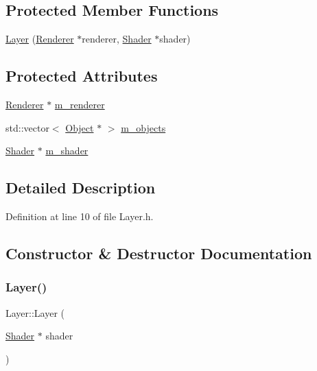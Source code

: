\subsection*{Protected Member Functions}
\begin{DoxyCompactItemize}
\item 
\hyperlink{class_layer_a4fe3c6314cb78fef7ffef3f6439fc195}{Layer} (\hyperlink{class_renderer}{Renderer} $\ast$renderer, \hyperlink{class_shader}{Shader} $\ast$shader)
\end{DoxyCompactItemize}
\subsection*{Protected Attributes}
\begin{DoxyCompactItemize}
\item 
\hyperlink{class_renderer}{Renderer} $\ast$ \hyperlink{class_layer_a37e53fc9b8764c7fa4b69de8f037a76f}{m\+\_\+renderer}
\item 
std\+::vector$<$ \hyperlink{class_object}{Object} $\ast$ $>$ \hyperlink{class_layer_a5dd19348285314342a7721c000c97179}{m\+\_\+objects}
\item 
\hyperlink{class_shader}{Shader} $\ast$ \hyperlink{class_layer_aa7cd5a12a7862c9127316d065278f5cc}{m\+\_\+shader}
\end{DoxyCompactItemize}


\subsection{Detailed Description}


Definition at line 10 of file Layer.\+h.



\subsection{Constructor \& Destructor Documentation}
\mbox{\label{class_layer_ad5cb744328eb91a6c0670efe57a9afbd}} 
\subsubsection{\texorpdfstring{Layer()}{Layer()}\hspace{0.1cm}{\footnotesize\ttfamily [1/2]}}
{\footnotesize\ttfamily Layer\+::\+Layer (\begin{DoxyParamCaption}\item[{\hyperlink{class_shader}{Shader} $\ast$}]{shader }\end{DoxyParamCaption})}


